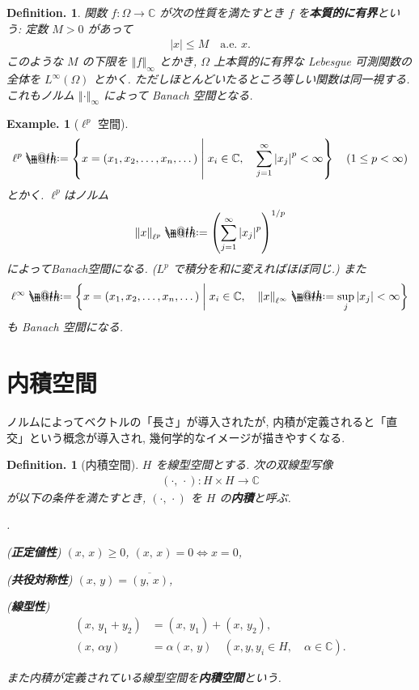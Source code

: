 \documentclass[openany, a4paper, oneside]{jsbook}
\makeatletter
\newcounter{enum2}
\renewenvironment{enumerate}{%
\begin{list}%
{%
\arabic{enum2}.\ \,%
}%
{%
\usecounter{enum2}
\setlength{\itemindent}{0pt}%
\setlength{\leftmargin}{15pt}%
\setlength{\rightmargin}{0pt}%
\setlength{\labelsep}{0pt}%
\setlength{\labelwidth}{6pt}%
\setlength{\itemsep}{0pt}%
\setlength{\parsep}{0pt}%
\setlength{\listparindent}{0pt}%
}
}{%
\end{list}%
}
\newcommand*{\defeq}{\mathrel{\rlap{%
\raisebox{0.3ex}{$\m@th\cdot$}}%
\raisebox{-0.3ex}{$\m@th\cdot$}}%
=}
\theoremstyle{break}
\theoremstyle{breakdefn}
\newtheorem{defn}[thm]{Definition.}
\newtheorem{ex}[thm]{Example.}
\newcommand{\abs}[1]{\left|#1\right|}
\newcommand{\norm}[1]{\left\Vert#1\right\Vert}
\newcommand{\inftynorm}[1]{\left\Vert#1\right\Vert_{\infty}}
\newcommand{\rbk}[1]{\left (#1\right)}
\newcommand{\rbkt}[2]{\left ( #1,\,#2 \right)}
\newcommand{\relmiddle}[1]{\mathrel{}\middle#1\mathrel{}}
\newcommand{\set}[2]{\left\{#1 \relmiddle| #2\right\}}
\newcommand{\bbC}{\mathbb{C}}
\makeatother
\begin{document}
\begin{defn}
関数 $f \colon \Omega \to \bbC$ が次の性質を満たすとき $f$ を\textbf{本質的に有界}という:
定数 $M > 0$ があって
\begin{align}
 \abs{x}
 \leq
 M \quad \text{a.e. } x.
\end{align}
このような $M$ の下限を $\inftynorm{f}$ とかき,
$\Omega$ 上本質的に有界な Lebesgue 可測関数の全体を $L^{\infty}(\Omega)$ とかく.
ただしほとんどいたるところ等しい関数は同一視する.
これもノルム  $\inftynorm{\cdot}$ によって Banach 空間となる.
\end{defn}

\begin{ex}[$\ell^p$ 空間]
\begin{align}
 \ell^p
 \defeq
 \set{x = (x_1, x_2, \dots, x_n, \dots)}{x_i \in \bbC, \quad \sum_{j=1}^{\infty} \abs{x_j}^p < \infty}
 \quad (1 \le p < \infty)
\end{align}
とかく.
$\ell^p$はノルム
\begin{align}
 \norm{x}_{\ell^p}
 \defeq
 \rbk{\sum_{j=1}^{\infty} \abs{x_j}^p}^{1/p}
\end{align}
によってBanach空間になる.
($L^p$ で積分を和に変えればほぼ同じ.)
また
\begin{align}
 \ell^{\infty}
 \defeq
 \set{x = (x_1, x_2, \dots, x_n, \dots)}{x_i \in \bbC, \quad \norm{x}_{\ell^{\infty}} \defeq \sup_j \abs{x_j} < \infty}
\end{align}
も Banach 空間になる.
\end{ex}
\section{内積空間}


ノルムによってベクトルの「長さ」が導入されたが,
内積が定義されると「直交」という概念が導入され,
幾何学的なイメージが描きやすくなる.

\begin{defn}[内積空間]
 $H$ を線型空間とする.
 次の双線型写像
 \begin{align}
  \rbkt{\cdot}{\cdot} \colon H \times H \to \bbC
 \end{align}
 が以下の条件を満たすとき, $\rbkt{\cdot}{\cdot}$ を $H$ の\textbf{内積}と呼ぶ.
\begin{enumerate}
\item (\textbf{正定値性}) $\rbkt{x}{x} \ge 0$, $\rbkt{x}{x} = 0 \Leftrightarrow x=0$,
\item (\textbf{共役対称性}) $\rbkt{x}{y} = \overline{\rbkt{y}{x}}$,
\item (\textbf{線型性})
    \begin{align}
     \rbkt{x}{y_1 + y_2}
     &=
      \rbkt{x}{y_1} + \rbkt{x}{y_2}, \\
     \rbkt{x}{\alpha y}
     &=
     \alpha \rbkt{x}{y} \quad (x, y, y_i \in H, \quad \alpha \in \bbC).
    \end{align}
\end{enumerate}
 また内積が定義されている線型空間を\textbf{内積空間}という.
\end{defn}
\end{document}
